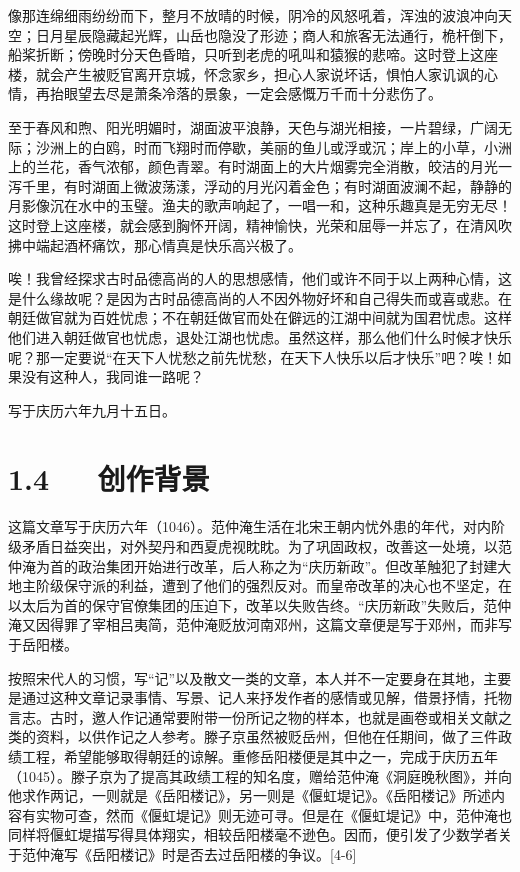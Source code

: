 \documentclass[letterpaper,12pt,english]{sphinxmanual}
\begin{document}
像那连绵细雨纷纷而下，整月不放晴的时候，阴冷的风怒吼着，浑浊的波浪冲向天空；日月星辰隐藏起光辉，山岳也隐没了形迹；商人和旅客无法通行，桅杆倒下，船桨折断；傍晚时分天色昏暗，只听到老虎的吼叫和猿猴的悲啼。这时登上这座楼，就会产生被贬官离开京城，怀念家乡，担心人家说坏话，惧怕人家讥讽的心情，再抬眼望去尽是萧条冷落的景象，一定会感慨万千而十分悲伤了。

至于春风和煦、阳光明媚时，湖面波平浪静，天色与湖光相接，一片碧绿，广阔无际；沙洲上的白鸥，时而飞翔时而停歇，美丽的鱼儿或浮或沉；岸上的小草，小洲上的兰花，香气浓郁，颜色青翠。有时湖面上的大片烟雾完全消散，皎洁的月光一泻千里，有时湖面上微波荡漾，浮动的月光闪着金色；有时湖面波澜不起，静静的月影像沉在水中的玉璧。渔夫的歌声响起了，一唱一和，这种乐趣真是无穷无尽！这时登上这座楼，就会感到胸怀开阔，精神愉快，光荣和屈辱一并忘了，在清风吹拂中端起酒杯痛饮，那心情真是快乐高兴极了。

唉！我曾经探求古时品德高尚的人的思想感情，他们或许不同于以上两种心情，这是什么缘故呢？是因为古时品德高尚的人不因外物好坏和自己得失而或喜或悲。在朝廷做官就为百姓忧虑；不在朝廷做官而处在僻远的江湖中间就为国君忧虑。这样他们进入朝廷做官也忧虑，退处江湖也忧虑。虽然这样，那么他们什么时候才快乐呢？那一定要说“在天下人忧愁之前先忧愁，在天下人快乐以后才快乐”吧？唉！如果没有这种人，我同谁一路呢？

写于庆历六年九月十五日。


\section{1.4   创作背景}
\label{\detokenize{p01_u6563_u6587/_u8303_u4ef2_u6df9-_u5cb3_u9633_u697c_u8bb0:id6}}
这篇文章写于庆历六年（1046）。范仲淹生活在北宋王朝内忧外患的年代，对内阶级矛盾日益突出，对外契丹和西夏虎视眈眈。为了巩固政权，改善这一处境，以范仲淹为首的政治集团开始进行改革，后人称之为“庆历新政”。但改革触犯了封建大地主阶级保守派的利益，遭到了他们的强烈反对。而皇帝改革的决心也不坚定，在以太后为首的保守官僚集团的压迫下，改革以失败告终。“庆历新政”失败后，范仲淹又因得罪了宰相吕夷简，范仲淹贬放河南邓州，这篇文章便是写于邓州，而非写于岳阳楼。

按照宋代人的习惯，写“记”以及散文一类的文章，本人并不一定要身在其地，主要是通过这种文章记录事情、写景、记人来抒发作者的感情或见解，借景抒情，托物言志。古时，邀人作记通常要附带一份所记之物的样本，也就是画卷或相关文献之类的资料，以供作记之人参考。滕子京虽然被贬岳州，但他在任期间，做了三件政绩工程，希望能够取得朝廷的谅解。重修岳阳楼便是其中之一，完成于庆历五年（1045）。滕子京为了提高其政绩工程的知名度，赠给范仲淹《洞庭晚秋图》，并向他求作两记，一则就是《岳阳楼记》，另一则是《偃虹堤记》。《岳阳楼记》所述内容有实物可查，然而《偃虹堤记》则无迹可寻。但是在《偃虹堤记》中，范仲淹也同样将偃虹堤描写得具体翔实，相较岳阳楼毫不逊色。因而，便引发了少数学者关于范仲淹写《岳阳楼记》时是否去过岳阳楼的争议。{[}4-6{]}
\end{document}
